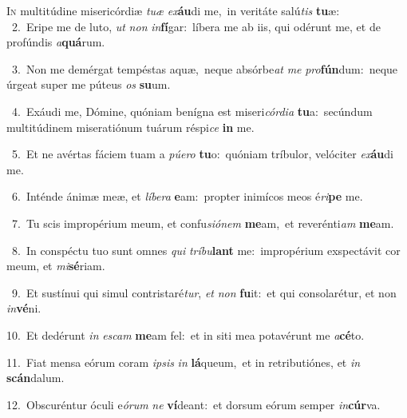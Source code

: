 \lettrine{\initial\textcolor{\initialcolor}{I}}{n} multitúdine misericórdiæ \textit{tu}\-\textit{æ} \textit{ex}\-\textbf{áu}di me,~\star in veritáte salú\textit{tis} \textbf{tu}\-æ:\\
{\numbfont\textcolor{\numbcolor}{~2.}}~Eripe me de luto, \textit{ut} \textit{non} \textit{in}\-\textbf{fí}gar:~\star líbera me ab iis, qui odérunt me, et de profúndis \textit{a}\-\textbf{quá}rum.\par
{\numbfont\textcolor{\numbcolor}{~3.}}~Non me demérgat tempéstas aquæ,~\dagger neque absórbe\textit{at} \textit{me} \textit{pro}\-\textbf{fún}dum:~\star neque úrgeat super me púteus \textit{os} \textbf{su}\-um.\par
{\numbfont\textcolor{\numbcolor}{~4.}}~Exáudi me, Dómine, quóniam benígna est miseri\-\textit{cór}\-\textit{di}\textit{a} \textbf{tu}\-a:~\star secúndum multitúdinem miseratiónum tuárum réspi\textit{ce} \textbf{in} me.\par
{\numbfont\textcolor{\numbcolor}{~5.}}~Et ne avértas fáciem tuam a \textit{pú}\-\textit{e}\textit{ro} \textbf{tu}\-o:~\star quóniam tríbulor, velóciter \textit{ex}\-\textbf{áu}di me.\par
{\numbfont\textcolor{\numbcolor}{~6.}}~Inténde ánimæ meæ, et \textit{lí}\-\textit{be}\textit{ra} \textbf{e}\-am:~\star propter inimícos meos é\-\textit{ri}\-\textbf{pe} me.\par
{\numbfont\textcolor{\numbcolor}{~7.}}~Tu scis impropérium meum, et confu\-\textit{si}\-\textit{ó}\textit{nem} \textbf{me}\-am,~\star et reverénti\textit{am} \textbf{me}\-am.\par
{\numbfont\textcolor{\numbcolor}{~8.}}~In conspéctu tuo sunt omnes \textit{qui} \textit{trí}\-\textit{bu}\textbf{lant} me:~\star impropérium exspectávit cor meum, et \textit{mi}\-\textbf{sé}riam.\par
{\numbfont\textcolor{\numbcolor}{~9.}}~Et sustínui qui simul contristaré\-\textit{tur}\-, \textit{et} \textit{non} \textbf{fu}\-it:~\star et qui consolarétur, et non \textit{in}\-\textbf{vé}ni.\par
{\numbfont\textcolor{\numbcolor}{10.}}~Et dedérunt \textit{in} \textit{es}\-\textit{cam} \textbf{me}\-am fel:~\star et in siti mea potavérunt me \textit{a}\-\textbf{cé}to.\par
{\numbfont\textcolor{\numbcolor}{11.}}~Fiat mensa eórum coram \textit{ip}\-\textit{sis} \textit{in} \textbf{lá}\-queum,~\star et in retributiónes, et \textit{in} \textbf{scán}\-dalum.\par
{\numbfont\textcolor{\numbcolor}{12.}}~Obscuréntur óculi e\-\textit{ó}\-\textit{rum} \textit{ne} \textbf{ví}\-deant:~\star et dorsum eórum semper \textit{in}\-\textbf{cúr}va.\par
